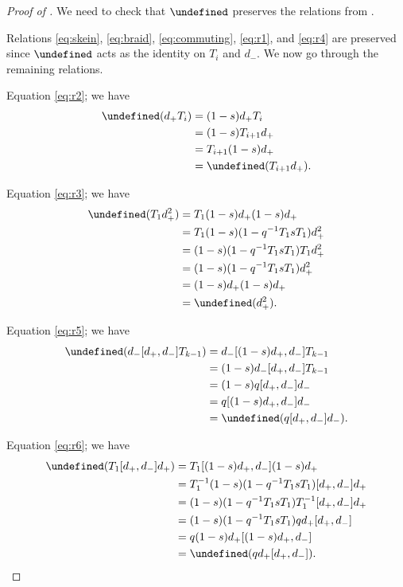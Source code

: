 \documentclass[reqno]{amsart}
\theoremstyle{plain}
\theoremstyle{definition}
\theoremstyle{remark}
\let\oldTheta\Theta
\let\Theta\undefined
\DeclareMathOperator{\Theta}{\oldTheta}
\newcommand{\<}{\langle}
\renewcommand{\>}{\rangle}
\begin{document}
\begin{proof}[Proof of {}]
    We need to check that $\Theta$ preserves the relations from .
    
    Relations \eqref{eq:skein}, \eqref{eq:braid}, \eqref{eq:commuting}, \eqref{eq:r1}, and \eqref{eq:r4} are preserved since $\Theta$ acts as the identity on $T_i$ and $d_-$. We now go through the remaining relations.

    Equation \eqref{eq:r2}; we have
    \begin{align*}
        \Theta(d_+ T_i) & = (1-s) d_+ T_i \\
        & = (1-s) T_{i+1} d_+  \\
        & = T_{i+1} (1-s) d_+ \\
        & = \Theta(T_{i+1} d_+).
    \end{align*}

    Equation \eqref{eq:r3}; we have
    \begin{align*}
        \Theta(T_1 d_+^2) & = T_1(1-s) d_+ (1-s) d_+ \\
        & = T_1 (1-s)(1-q^{-1}T_1sT_1) d_+^2 \\
        & = (1-s)(1 - q^{-1} T_1 s T_1) T_1 d_+^2 \\
        & = (1-s)(1 - q^{-1} T_1 s T_1) d_+^2 \\
        & = (1-s) d_+ (1-s) d_+ \\
        & = \Theta(d_+^2).
    \end{align*}

    Equation \eqref{eq:r5}; we have
    \begin{align*}
        \Theta(d_- [d_+, d_-] T_{k-1}) & = d_- [(1-s) d_+, d_-] T_{k-1} \\
        & = (1-s) d_- [d_+, d_-] T_{k-1} \\
        & = (1-s) q [d_+, d_-] d_- \\
        & = q [(1-s) d_+, d_-] d_- \\
        & = \Theta(q [d_+, d_-] d_-).
    \end{align*}

    Equation \eqref{eq:r6}; we have
    \begin{align*}
        \Theta(T_1 [d_+, d_-] d_+) & = T_1 [(1-s) d_+,d_-](1-s) d_+ \\
        & = T_1^{-1}(1-s)(1 - q^{-1} T_1 s T_1) [d_+,d_-] d_+ \\
        & = (1-s)(1 - q^{-1} T_1 s T_1) T_1^{-1} [d_+,d_-] d_+ \\
        & = (1-s)(1 - q^{-1} T_1 s T_1) q d_+[d_+,d_-] \\
        & = q (1-s) d_+ [(1-s) d_+, d_-] \\
        & = \Theta(q d_+ [d_+, d_-]).
    \end{align*}


\end{proof}
\end{document}
